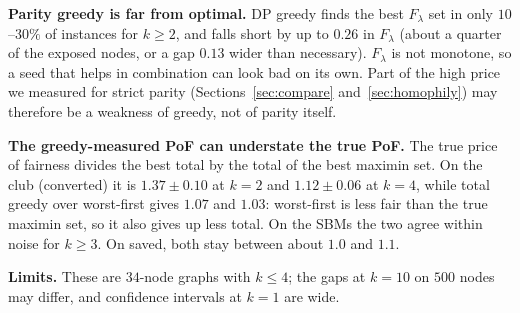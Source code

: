 \textbf{Parity greedy is far from optimal.} DP greedy finds the best $F_\lambda$ set in only $10$--$30\%$ of instances for $k\ge2$, and falls short by up to $0.26$ in $F_\lambda$ (about a quarter of the exposed nodes, or a gap $0.13$ wider than necessary). $F_\lambda$ is not monotone, so a seed that helps in combination can look bad on its own. Part of the high price we measured for strict parity (Sections~\ref{sec:compare} and~\ref{sec:homophily}) may therefore be a weakness of greedy, not of parity itself.

\textbf{The greedy-measured PoF can understate the true PoF.} The true price of fairness divides the best total by the total of the best maximin set. On the club (converted) it is $1.37\pm0.10$ at $k=2$ and $1.12\pm0.06$ at $k=4$, while total greedy over worst-first gives $1.07$ and $1.03$: worst-first is less fair than the true maximin set, so it also gives up less total. On the SBMs the two agree within noise for $k\ge3$. On saved, both stay between about $1.0$ and $1.1$.

\textbf{Limits.} These are $34$-node graphs with $k\le4$; the gaps at $k=10$ on $500$ nodes may differ, and confidence intervals at $k=1$ are wide.

